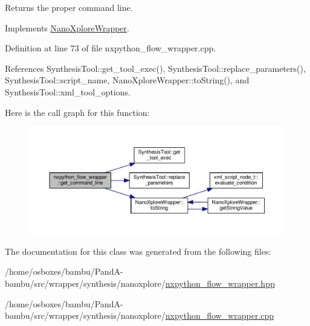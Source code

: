 Returns the proper command line. 



Implements \hyperlink{classNanoXploreWrapper_a9aa78eed555faf8bc6970e05f7f8497c}{Nano\+Xplore\+Wrapper}.



Definition at line 73 of file nxpython\+\_\+flow\+\_\+wrapper.\+cpp.



References Synthesis\+Tool\+::get\+\_\+tool\+\_\+exec(), Synthesis\+Tool\+::replace\+\_\+parameters(), Synthesis\+Tool\+::script\+\_\+name, Nano\+Xplore\+Wrapper\+::to\+String(), and Synthesis\+Tool\+::xml\+\_\+tool\+\_\+options.

Here is the call graph for this function\+:
\nopagebreak
\begin{figure}[H]
\begin{center}
\leavevmode
\includegraphics[width=350pt]{df/d48/classnxpython__flow__wrapper_ad88b053a2d5f727075d1e8dc2d574863_cgraph}
\end{center}
\end{figure}


The documentation for this class was generated from the following files\+:\begin{DoxyCompactItemize}
\item 
/home/osboxes/bambu/\+Pand\+A-\/bambu/src/wrapper/synthesis/nanoxplore/\hyperlink{nxpython__flow__wrapper_8hpp}{nxpython\+\_\+flow\+\_\+wrapper.\+hpp}\item 
/home/osboxes/bambu/\+Pand\+A-\/bambu/src/wrapper/synthesis/nanoxplore/\hyperlink{nxpython__flow__wrapper_8cpp}{nxpython\+\_\+flow\+\_\+wrapper.\+cpp}\end{DoxyCompactItemize}
